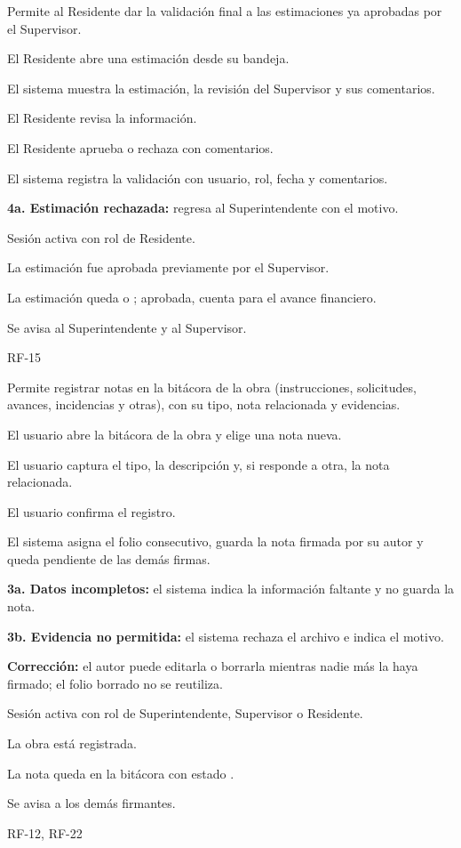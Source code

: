 {Permite al Residente dar la validación final a las estimaciones ya aprobadas por el Supervisor.}
{\item El Residente abre una estimación  desde su bandeja.
 \item El sistema muestra la estimación, la revisión del Supervisor y sus comentarios.
 \item El Residente revisa la información.
 \item El Residente aprueba o rechaza con comentarios.
 \item El sistema registra la validación con usuario, rol, fecha y comentarios.}
{\item \textbf{4a. Estimación rechazada:} regresa al Superintendente con el motivo.}
{\item Sesión activa con rol de Residente.
 \item La estimación fue aprobada previamente por el Supervisor.}
{\item La estimación queda  o ; aprobada, cuenta para el avance financiero.
 \item Se avisa al Superintendente y al Supervisor.}
{RF-15}

{Permite registrar notas en la bitácora de la obra (instrucciones, solicitudes, avances, incidencias y otras), con su tipo, nota relacionada y evidencias.}
{\item El usuario abre la bitácora de la obra y elige una nota nueva.
 \item El usuario captura el tipo, la descripción y, si responde a otra, la nota relacionada.
 \item El usuario confirma el registro.
 \item El sistema asigna el folio consecutivo, guarda la nota firmada por su autor y queda pendiente de las demás firmas.}
{\item \textbf{3a. Datos incompletos:} el sistema indica la información faltante y no guarda la nota.
 \item \textbf{3b. Evidencia no permitida:} el sistema rechaza el archivo e indica el motivo.
 \item \textbf{Corrección:} el autor puede editarla o borrarla mientras nadie más la haya firmado; el folio borrado no se reutiliza.}
{\item Sesión activa con rol de Superintendente, Supervisor o Residente.
 \item La obra está registrada.}
{\item La nota queda en la bitácora con estado .
 \item Se avisa a los demás firmantes.}
{RF-12, RF-22}

